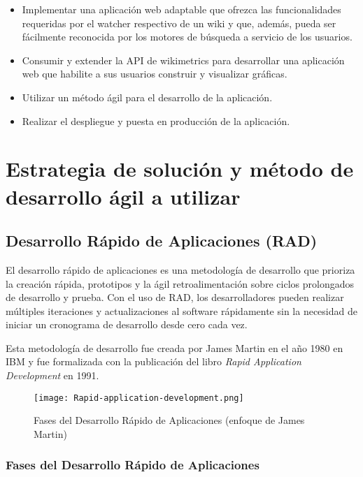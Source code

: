 \begin{itemize}
    \item Implementar una aplicación web adaptable que ofrezca las funcionalidades requeridas por el watcher respectivo de un wiki y que, además, pueda ser fácilmente reconocida por los motores de búsqueda a servicio de los usuarios.
    \item Consumir y extender la API de wikimetrics para desarrollar una aplicación web que habilite a sus usuarios construir y visualizar gráficas.
    \item Utilizar un método ágil para el desarrollo de la aplicación.
    \item Realizar el despliegue y puesta en producción de la aplicación.
\end{itemize}

\section{Estrategia de solución y método de desarrollo ágil a utilizar}

\subsection{Desarrollo Rápido de Aplicaciones (RAD)}


El desarrollo rápido de aplicaciones es una metodología de desarrollo que prioriza la creación rápida, prototipos y la ágil retroalimentación sobre ciclos prolongados de desarrollo y prueba. Con el uso de RAD, los desarrolladores pueden realizar múltiples iteraciones y actualizaciones al software rápidamente sin la necesidad de iniciar un cronograma de desarrollo desde cero cada vez.

Esta metodología de desarrollo fue creada por James Martin en el año 1980 en IBM y fue formalizada con la publicación del libro \emph{Rapid Application Development} en 1991.

\begin{figure}[H]
    \centering
    \texttt{[image: Rapid-application-development.png]}
    \caption{Fases del Desarrollo Rápido de Aplicaciones (enfoque de James Martin)}
    \label{fig:Rapid-application-development}
\end{figure}

\subsubsection{Fases del Desarrollo Rápido de Aplicaciones}

